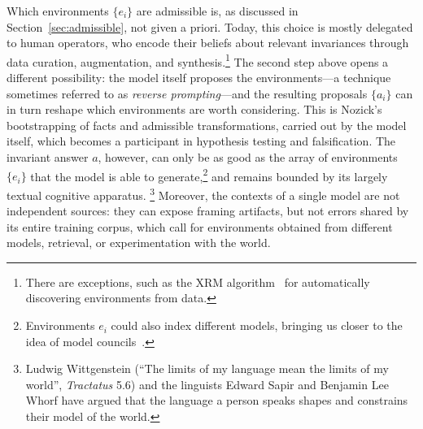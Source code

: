Which environments $\{e_i\}$ are admissible is, as discussed in Section~\ref{sec:admissible}, not given a priori. Today, this choice is mostly delegated to human operators, who encode their beliefs about relevant invariances through data curation, augmentation, and synthesis.\footnote{There are exceptions, such as the XRM algorithm~\citep{xrm} for automatically discovering environments from data.} The second step above opens a different possibility: the model itself proposes the environments---a technique sometimes referred to as \emph{reverse prompting}---and the resulting proposals $\{a_i\}$ can in turn reshape which environments are worth considering. This is Nozick's bootstrapping of facts and admissible transformations, carried out by the model itself, which becomes a participant in hypothesis testing and falsification. The invariant answer $a$, however, can only be as good as the array of environments $\{e_i\}$ that the model is able to generate,\footnote{Environments $e_i$ could also index different models, bringing us closer to the idea of model councils~\citep{perplexity2026modelcouncil}.} 
and remains bounded by its largely textual cognitive apparatus.
\footnote{Ludwig Wittgenstein (``The limits of my language mean the limits of my world'', \emph{Tractatus} 5.6) and the linguists Edward Sapir and Benjamin Lee Whorf have argued that the language a person speaks shapes and constrains their model of the world.}
Moreover, the contexts of a single model are not independent sources: they can expose framing artifacts, but not errors shared by its entire training corpus, which call for environments obtained from different models, retrieval, or experimentation with the world.

